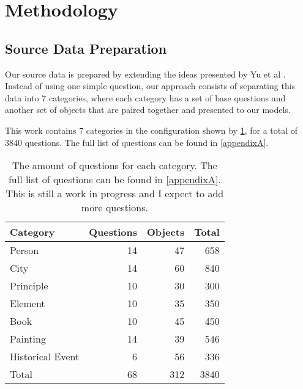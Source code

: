 \section{Methodology}

\newcommand{\param}{\ensuremath{p}}
\newcommand{\cparam}{\ensuremath{\overline{p}}}
\newcommand{\noctx}{\ensuremath{Q}}
\newcommand{\ctx}{\ensuremath{W}}
\newcommand{\NLL}{\text{NLL}}
\newcommand{\Perp}{\text{PPL}}

\newcommand{\cats}{7}
\newcommand{\baseqs}{68}
\newcommand{\things}{312}
\newcommand{\qs}{3840}

\subsection{Source Data Preparation}
\label{preparation}

Our source data is prepared by extending the ideas presented by Yu et al \citep{factual_recall}.
Instead of using one simple question, our approach consists of separating this data into \cats{} categories, where each category has a set of base questions and another set of objects that are paired together and presented to our models.

This work contains \cats{} categories in the configuration shown by \cref{categories_numbers}, for a total of \qs{} questions.
The full list of questions can be found in \cref{appendixA}.

\begin{table}[h]
	\centering
	\scriptsize
	\begin{tabular}{l | r r r}
		\toprule
			\bfseries Category & \bfseries Questions & \bfseries Objects & \bfseries Total \\
		\midrule
			Person           & 14 &  47 &  658 \\
			City             & 14 &  60 &  840 \\
			Principle        & 10 &  30 &  300 \\
			Element          & 10 &  35 &  350 \\
			Book             & 10 &  45 &  450 \\
			Painting         & 14 &  39 &  546 \\
			Historical Event & 6  &  56 &  336 \\
		\midrule
			Total & \baseqs{} & \things{} & \qs{} \\
		\bottomrule
	\end{tabular}
	\caption{The amount of questions for each category. The full list of questions can be found in \cref{appendixA}. This is still a work in progress and I expect to add more questions.}
	\label{categories_numbers}
\end{table}

